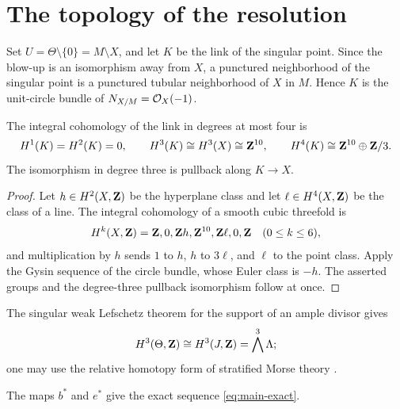 \section{The topology of the resolution}\label{sec:topology}

Set \(U=\Theta\setminus\{0\}=M\setminus X\), and let \(K\) be the link of
the singular point.  Since the blow-up is an isomorphism away from \(X\), a
punctured neighborhood of the singular point is a punctured tubular
neighborhood of \(X\) in \(M\).  Hence \(K\) is the unit-circle bundle of
\(N_{X/M}=\mathcal O_X(-1)\).

\begin{lemma}\label{lem:link-cohomology}
The integral cohomology of the link in degrees at most four is
\[
 H^1(K)=H^2(K)=0,\qquad
 H^3(K)\cong H^3(X)\cong\mathbf Z^{10},\qquad
 H^4(K)\cong\mathbf Z^{10}\oplus\mathbf Z/3.
\]
The isomorphism in degree three is pullback along \(K\to X\).
\end{lemma}

\begin{proof}
Let \(h\in H^2(X,\mathbf Z)\) be the hyperplane class and let
\(\ell\in H^4(X,\mathbf Z)\) be the class of a line.  The integral cohomology of a
smooth cubic threefold is
\[
 H^k(X,\mathbf Z)=\mathbf Z,0,\mathbf Z h,\mathbf Z^{10},\mathbf Z\ell,0,\mathbf Z
 \quad(0\leq k\leq6),
\]
and multiplication by \(h\) sends \(1\) to \(h\), \(h\) to
\(3\ell\), and \(\ell\) to the point class.  Apply the Gysin sequence of
the circle bundle, whose Euler class is \(-h\).  The asserted groups and
the degree-three pullback isomorphism follow at once.
\end{proof}

The singular weak Lefschetz theorem for the support of an ample divisor
gives
\begin{equation}\label{eq:weak-lefschetz}
 H^3(\Theta,\mathbf Z)\cong H^3(J,\mathbf Z)=\bigwedge^3\Lambda;
\end{equation}
one may use the relative homotopy form of stratified Morse theory
\cite[Part~II, \S1.2]{GoreskyMacPherson}.

\begin{proposition}\label{prop:topological-exact}
The maps \(b^*\) and \(e^*\) give the exact sequence
\eqref{eq:main-exact}.
\end{proposition}


